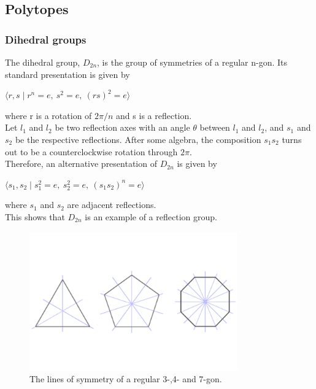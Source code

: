 \documentclass[../main.tex]{subfiles}
\begin{document}
\subsection{Polytopes}

\subsubsection{Dihedral groups}

The dihedral group, $D_{2n}$, is the group of symmetries of a regular n-gon. Its standard presentation is given by\\
\vspace{-1em}
\begin{center}
$\langle r, s \mid r^n = e,\ s^2 = e,\ (rs)^2 = e \rangle$
\end{center}
\vspace{0em}
where r is a rotation of $2\pi/n$ and s is a reflection.\\

Let $l_{1}$ and $l_{2}$ be two reflection axes with an angle $\theta$ between $l_{1}$ and $l_{2}$, and $s_{1}$ and $s_{2}$ be the respective reflections. After some algebra, the composition $s_{1}s_{2}$ turns out to be a counterclockwise rotation through $2\pi$.\\

Therefore, an alternative presentation of $D_{2n}$ is given by\\
\vspace{-1em}
\begin{center}
$\langle s_{1}, s_{2} \mid s_{1}^2 = e,\ s_{2}^2 = e,\ (s_{1}s_{2})^n = e \rangle$
\end{center}
\vspace{0em}
where $s_{1}$ and $s_{2}$ are adjacent reflections.\\

This shows that $D_{2n}$ is an example of a reflection group.

\begin{figure}[ht]
    \centering
    \includegraphics[width=0.8\textwidth]{polygons.pdf}
    \caption{The lines of symmetry of a regular 3-,4- and 7-gon.}
    \label{}
\end{figure}
\end{document}
